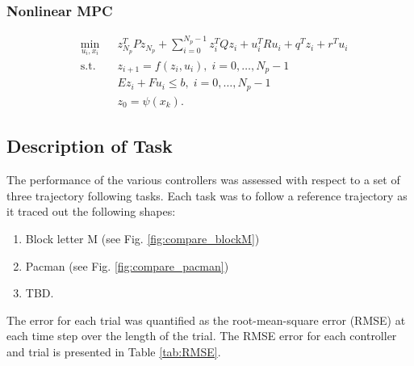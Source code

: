 \subsubsection{Nonlinear MPC}

\begin{equation}
\begin{aligned}
& \underset{u_{i} , x_{i}}{\text{min}}
& & z_{N_p}^{T} P z_{N_p} + \sum_{i=0}^{N_p - 1} z_i^T Q z_i + u_i^T R u_i + q^T z_i + r^T u_i\\
& \text{s.t.}
& & z_{i+1} = f( z_i , u_i ) , \; i = 0 , \ldots , N_p - 1 \\
&&& E z_i + F u_i \leq b , \; i = 0 , \ldots , N_p - 1 \\
&&& z_0 = \psi(x_k).
\end{aligned}
\end{equation}

\subsection{Description of Task}

The performance of the various controllers was assessed with respect to a set of three trajectory following tasks.
Each task was to follow a reference trajectory as it traced out the following shapes:
\begin{enumerate}
    \item Block letter M (see Fig. \ref{fig:compare_blockM})
    \item Pacman (see Fig. \ref{fig:compare_pacman})
    \item TBD.
\end{enumerate}
The error for each trial was quantified as the root-mean-square error (RMSE) at each time step over the length of the trial.
The RMSE error for each controller and trial is presented in Table \ref{tab:RMSE}.